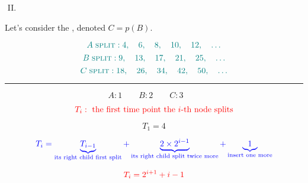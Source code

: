 \begin{frame}{}
  \begin{enumerate}[(I)]
    \setcounter{enumi}{1}
    \centering
    \item {}
  \end{enumerate}

  \pause
  \vspace{0.80cm}
  \begin{center}
    Let's consider the , denoted $C = p(B)$.
  \end{center}
\end{frame}

\begin{frame}{}
  \[
    \textcolor{teal}{A\; \textsc{split}: 4,\quad 6,\quad 8,\quad 10,\quad 12,\quad \dots}
  \]
  \[
    \textcolor{teal}{B\; \textsc{split}: 9,\quad 13,\quad 17,\quad 21,\quad 25,\quad \dots}
  \]
  \[
    \textcolor{teal}{C\; \textsc{split}: 18,\quad 26,\quad 34,\quad 42,\quad 50,\quad \dots}
  \]

  \pause
  \hrule
  \[
    A: 1 \qquad B: 2 \qquad C: 3 \qquad
  \]

  \[
    \textcolor{red}{T_{i}: \text{ the first time point the $i$-th node splits}}
  \]

  \pause
  \[
    T_{1} = 4
  \]
  
  \pause
  \[
    \textcolor{blue}{T_{i} = \underbrace{T_{i-1}}_{\text{its right child first split}} + 
        \underbrace{2 \times 2^{i-1}}_{\text{its right child split twice more}} + 
        \underbrace{1}_{\text{insert one more}}}
  \]

  \pause
  \[
    \textcolor{red}{T_{i} = 2^{i+1} + i - 1}
  \]
\end{frame}
